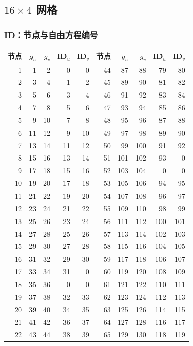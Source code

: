 \subsection{$16\times4$ 网格}
\subsubsection*{ID：节点与自由方程编号}
\small\begin{longtable}{rrrrr@{\qquad}rrrrr}
\toprule 节点 & $g_u$ & $g_v$ & ID$_u$ & ID$_v$ & 节点 & $g_u$ & $g_v$ & ID$_u$ & ID$_v$ \\ \midrule\endhead
1 & 1 & 2 & 0 & 0 & 44 & 87 & 88 & 79 & 80 \\
2 & 3 & 4 & 1 & 2 & 45 & 89 & 90 & 81 & 82 \\
3 & 5 & 6 & 3 & 4 & 46 & 91 & 92 & 83 & 84 \\
4 & 7 & 8 & 5 & 6 & 47 & 93 & 94 & 85 & 86 \\
5 & 9 & 10 & 7 & 8 & 48 & 95 & 96 & 87 & 88 \\
6 & 11 & 12 & 9 & 10 & 49 & 97 & 98 & 89 & 90 \\
7 & 13 & 14 & 11 & 12 & 50 & 99 & 100 & 91 & 92 \\
8 & 15 & 16 & 13 & 14 & 51 & 101 & 102 & 93 & 0 \\
9 & 17 & 18 & 15 & 16 & 52 & 103 & 104 & 0 & 0 \\
10 & 19 & 20 & 17 & 18 & 53 & 105 & 106 & 94 & 95 \\
11 & 21 & 22 & 19 & 20 & 54 & 107 & 108 & 96 & 97 \\
12 & 23 & 24 & 21 & 22 & 55 & 109 & 110 & 98 & 99 \\
13 & 25 & 26 & 23 & 24 & 56 & 111 & 112 & 100 & 101 \\
14 & 27 & 28 & 25 & 26 & 57 & 113 & 114 & 102 & 103 \\
15 & 29 & 30 & 27 & 28 & 58 & 115 & 116 & 104 & 105 \\
16 & 31 & 32 & 29 & 30 & 59 & 117 & 118 & 106 & 107 \\
17 & 33 & 34 & 31 & 0 & 60 & 119 & 120 & 108 & 109 \\
18 & 35 & 36 & 0 & 0 & 61 & 121 & 122 & 110 & 111 \\
19 & 37 & 38 & 32 & 33 & 62 & 123 & 124 & 112 & 113 \\
20 & 39 & 40 & 34 & 35 & 63 & 125 & 126 & 114 & 115 \\
21 & 41 & 42 & 36 & 37 & 64 & 127 & 128 & 116 & 117 \\
22 & 43 & 44 & 38 & 39 & 65 & 129 & 130 & 118 & 119 \\

\end{longtable}
